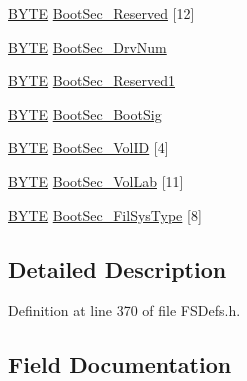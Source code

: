 \begin{DoxyCompactItemize}
\item 
\hyperlink{_generic_type_defs_8h_a4ae1dab0fb4b072a66584546209e7d58}{B\+Y\+T\+E} \hyperlink{struct___b_p_b___f_a_t32_a0ad3246e76c905097cba045dbaf9f491}{Boot\+Sec\+\_\+\+Reserved} \mbox{[}12\mbox{]}
\item 
\hyperlink{_generic_type_defs_8h_a4ae1dab0fb4b072a66584546209e7d58}{B\+Y\+T\+E} \hyperlink{struct___b_p_b___f_a_t32_aebe97f780d9d183a37dd72b5058474b7}{Boot\+Sec\+\_\+\+Drv\+Num}
\item 
\hyperlink{_generic_type_defs_8h_a4ae1dab0fb4b072a66584546209e7d58}{B\+Y\+T\+E} \hyperlink{struct___b_p_b___f_a_t32_a10cd4a04d8f6ca61140277ded6f3e14e}{Boot\+Sec\+\_\+\+Reserved1}
\item 
\hyperlink{_generic_type_defs_8h_a4ae1dab0fb4b072a66584546209e7d58}{B\+Y\+T\+E} \hyperlink{struct___b_p_b___f_a_t32_a71da1da2548ac5984ace7ab86665b290}{Boot\+Sec\+\_\+\+Boot\+Sig}
\item 
\hyperlink{_generic_type_defs_8h_a4ae1dab0fb4b072a66584546209e7d58}{B\+Y\+T\+E} \hyperlink{struct___b_p_b___f_a_t32_a19b97dc43f9c18bf43e56c688f62adac}{Boot\+Sec\+\_\+\+Vol\+I\+D} \mbox{[}4\mbox{]}
\item 
\hyperlink{_generic_type_defs_8h_a4ae1dab0fb4b072a66584546209e7d58}{B\+Y\+T\+E} \hyperlink{struct___b_p_b___f_a_t32_a34d3ba193b23a25841d0bb1896f87889}{Boot\+Sec\+\_\+\+Vol\+Lab} \mbox{[}11\mbox{]}
\item 
\hyperlink{_generic_type_defs_8h_a4ae1dab0fb4b072a66584546209e7d58}{B\+Y\+T\+E} \hyperlink{struct___b_p_b___f_a_t32_a72ebdad9deefbe36f7876a0602d08c47}{Boot\+Sec\+\_\+\+Fil\+Sys\+Type} \mbox{[}8\mbox{]}
\end{DoxyCompactItemize}


\subsection{Detailed Description}


Definition at line 370 of file F\+S\+Defs.\+h.



\subsection{Field Documentation}
\hypertarget{struct___b_p_b___f_a_t32_aa79662dd7c2b92b6d2fa39d24c226356}{}
